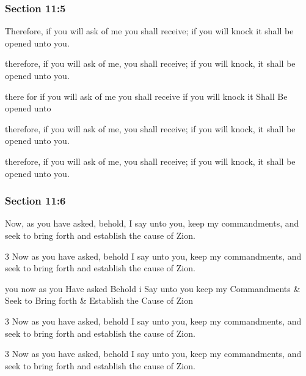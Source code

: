 	\subsubsection{Section 11:5} %
		\label{DC11-5}

		Therefore, if you will ask of me you shall receive; if you will knock it shall be opened unto you.

		\begin{framed}
		\scriptsize
			\begin{compactdesc}
				\item[JSP] therefore, if you will ask of me, you shall receive; if you will knock, it shall be opened unto you.
				\item[HS] there for if you will ask of me you shall receive if you will knock it Shall Be opened unto
				\item[DC 1835] therefore, if you will ask of me, you shall receive; if you will knock, it shall be opened unto you.
				\item[DC 1844] therefore, if you will ask of me, you shall receive; if you will knock, it shall be opened unto you.
			\end{compactdesc}
		\end{framed}

	\subsubsection{Section 11:6} %
		\label{DC11-6}

		Now, as you have asked, behold, I say unto you, keep my commandments, and seek to bring forth and establish the cause of Zion.

		\begin{framed}
		\scriptsize
			\begin{compactdesc}
				\item[JSP] 3 Now as you have asked, behold I say unto you, keep my commandments, and seek to bring forth and establish the cause of Zion.
				\item[HS] you now as you Have asked Behold i Say unto you keep my Commandments \& Seek to Bring forth \& Establish the Cause of Zion 
				\item[DC 1835] 3 Now as you have asked, behold I say unto you, keep my commandments, and seek to bring forth and establish the cause of Zion. 
				\item[DC 1844] 3 Now as you have asked, behold I say unto you, keep my commandments, and seek to bring forth and establish the cause of Zion. 
			\end{compactdesc}
		\end{framed}

